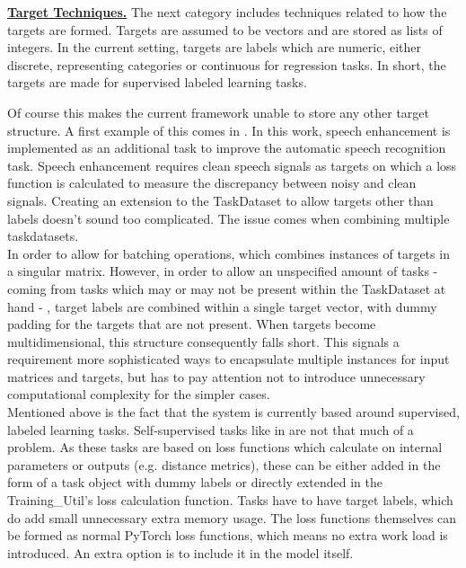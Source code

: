 \underline{\textbf{Target Techniques.}} The next category includes techniques related to how the targets are formed. Targets are assumed to be vectors and are stored as lists of integers. In the current setting, targets are labels which are numeric, either discrete, representing categories or continuous for regression tasks. In short, the targets are made for supervised labeled learning tasks.

Of course this makes the current framework unable to store any other target structure. A first example of this comes in \cite{lu2004multitask}. In this work, speech enhancement is implemented as an additional task to improve the automatic speech recognition task. Speech enhancement requires clean speech signals as targets on which a loss function is calculated to measure the discrepancy between noisy and clean signals. Creating an extension to the TaskDataset to allow targets other than labels doesn't sound too complicated. The issue comes when combining multiple taskdatasets.\\

In order to allow for batching operations, which combines instances of targets in a singular matrix. However, in order to allow an unspecified amount of tasks - coming from tasks which may or may not be present within the TaskDataset at hand - , target labels are combined within a single target vector, with dummy padding for the targets that are not present. When targets become multidimensional, this structure consequently falls short. This signals a requirement more sophisticated ways to encapsulate multiple instances for input matrices and targets, but has to pay attention not to introduce unnecessary computational complexity for the simpler cases. \\

Mentioned above is the fact that the system is currently based around supervised, labeled learning tasks. Self-supervised tasks like in \cite{lee2019label} are not that much of a problem. As these tasks are based on loss functions which calculate on internal parameters or outputs (e.g. distance metrics), these can be either added in the form of a task object with dummy labels or directly extended in the Training\_Util's loss calculation function. Tasks have to have target labels, which do add small unnecessary extra memory usage. The loss functions themselves can be formed as normal PyTorch loss functions, which means no extra work load is introduced. An extra option is to include it in the model itself.\\

